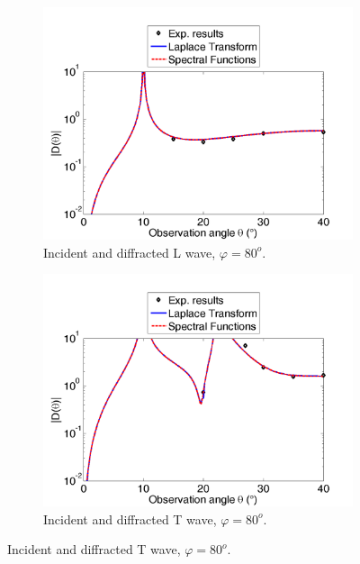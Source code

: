 \begin{figure}[h!]
\centering
    \begin{subfigure}[b]{0.49\textwidth}
        \includegraphics[width=\textwidth]{images/chapter3/Retrodiff_D_80_LL.png}
        \caption{Incident and diffracted L wave, $\varphi=80^o$.}
        \label{C3:DLL80}
    \end{subfigure}
    \begin{subfigure}[b]{0.49\textwidth}
        \includegraphics[width=\textwidth]{images/chapter3/Retrodiff_D_80_TT.png}
        \caption{Incident and diffracted T wave, $\varphi=80^o$.}
        \label{C3:DTT80}
     \end{subfigure} %

\end{figure}
